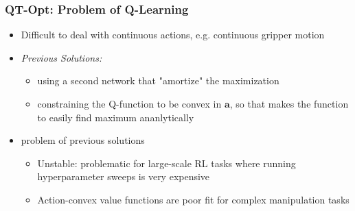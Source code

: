 \documentclass{beamer}
\renewcommand{\vec}[1]{\mathbf{#1}}
\newcommand{\forthSec}{QT-Opt}
\begin{document}
    \begin{frame}
      \frametitle{\forthSec: Problem of Q-Learning}
      \begin{itemize}
        \item Difficult to deal with continuous actions, \footnotesize{e.g. continuous gripper motion}
        \pause
        \item \normalsize{\textit{Previous Solutions:}}
        \begin{itemize}
          \item using a second network that "amortize" the maximization
          \item constraining the Q-function to be convex in $\vec{a}$, so that makes the function to easily find maximum ananlytically
        \end{itemize}
        \pause
        \item problem of previous solutions
        \begin{itemize}
          \item Unstable: problematic for large-scale RL tasks where running hyperparameter sweeps is very expensive
          \item Action-convex value functions are poor fit for complex manipulation tasks \\
        \end{itemize}
      \end{itemize}
    \end{frame}
\end{document}
